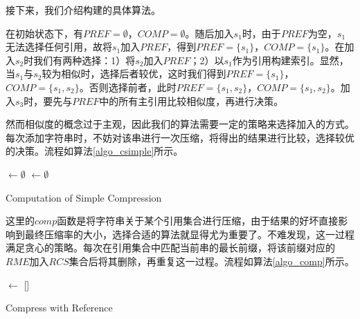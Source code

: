 ﻿\documentclass{sysuthesis}
\begin{document}
接下来，我们介绍构建的具体算法。\par
在初始状态下，有$PREF = \emptyset$，$COMP = \emptyset$。随后加入$s_{1}$时，由于$PREF$为空，$s_{1}$无法选择任何引用，故将$s_{1}$加入$PREF$，得到$PREF = \{s_{1}\}$，$COMP = \{s_{1}\}$。在加入$s_{2}$时我们有两种选择：1）将$s_{2}$加入$PREF$；2）以$s_{1}$作为引用构建索引。显然，当$s_{1}$与$s_{2}$较为相似时，选择后者较优，这时我们得到$PREF = \{s_{1}\}$，$COMP = \{s_{1}, s_{2}\}$。否则选择前者，此时$PREF = \{s_{1}, s_{2}\}$，$COMP = \{s_{1}, s_{2}\}$。加入$s_{3}$时，要先与$PREF$中的所有主引用比较相似度，再进行决策。\par
然而相似度的概念过于主观，因此我们的算法需要一定的策略来选择加入的方式。每次添加字符串时，不妨对该串进行一次压缩，将得出的结果进行比较，选择较优的决策。流程如算法\ref{algo_csimple}所示。\par

\begin{algorithm}[H]
	\Output{\PREF, \COMP}
	\PREF $\leftarrow \emptyset$\;
	\COMP $\leftarrow \emptyset$\;
	\caption{Computation of Simple Compression}\label{algo_csimple}
\end{algorithm}

这里的$comp$函数是将字符串关于某个引用集合进行压缩，由于结果的好坏直接影响到最终压缩率的大小，选择合适的算法就显得尤为重要了。不难发现，这一过程满足贪心的策略。每次在引用集合中匹配当前串的最长前缀，将该前缀对应的$RME$加入$RCS$集合后将其删除，再重复这一过程。流程如算法\ref{algo_comp}所示。\par

\begin{algorithm}[H]
	\rcs $\leftarrow$ []\;
	\caption{Compress with Reference}\label{algo_comp}
\end{algorithm}
\end{document}
